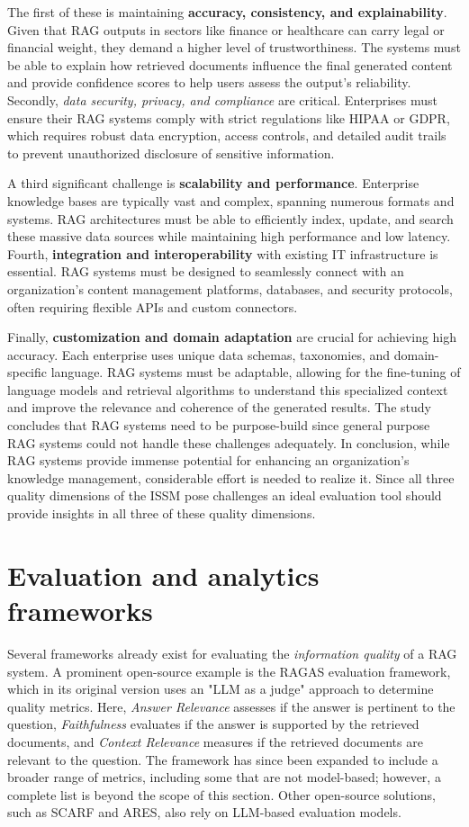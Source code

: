 \documentclass[
	english,
	ruledheaders=section,%
	class=report,%
	thesis={type=bachelor},%
	accentcolor=1b,%
	custommargins=true,%
	marginpar=false,%
	parskip=half-,%
	fontsize=11pt,%
	DIV=14,
]{tudapub}
\begin{document}
The first of these is maintaining \textbf{accuracy, consistency, and explainability}. Given that RAG outputs in sectors like finance or healthcare can carry legal or financial weight, they demand a higher level of trustworthiness. The systems must be able to explain how retrieved documents influence the final generated content and provide confidence scores to help users assess the output's reliability. Secondly, \emph{data security, privacy, and compliance} are critical. Enterprises must ensure their RAG systems comply with strict regulations like HIPAA or GDPR, which requires robust data encryption, access controls, and detailed audit trails to prevent unauthorized disclosure of sensitive information.

A third significant challenge is \textbf{scalability and performance}. Enterprise knowledge bases are typically vast and complex, spanning numerous formats and systems. RAG architectures must be able to efficiently index, update, and search these massive data sources while maintaining high performance and low latency. Fourth, \textbf{integration and interoperability} with existing IT infrastructure is essential. RAG systems must be designed to seamlessly connect with an organization's content management platforms, databases, and security protocols, often requiring flexible APIs and custom connectors.

Finally, \textbf{customization and domain adaptation} are crucial for achieving high accuracy. Each enterprise uses unique data schemas, taxonomies, and domain-specific language. RAG systems must be adaptable, allowing for the fine-tuning of language models and retrieval algorithms to understand this specialized context and improve the relevance and coherence of the generated results.
The study concludes that RAG systems need to be purpose-build since general purpose RAG systems could not handle these challenges adequately.
In conclusion, while RAG systems provide immense potential for enhancing an organization's knowledge management, considerable effort is needed to realize it. Since all three quality dimensions of the ISSM pose challenges an ideal evaluation tool should provide insights in all three of these quality dimensions.
\section{Evaluation and analytics frameworks}
Several frameworks already exist for evaluating the \textit{information quality} of a RAG system. A prominent open-source example is the RAGAS evaluation framework, which in its original version uses an "LLM as a judge" approach to determine quality metrics. Here, \textit{Answer Relevance} assesses if the answer is pertinent to the question, \textit{Faithfulness} evaluates if the answer is supported by the retrieved documents, and \textit{Context Relevance} measures if the retrieved documents are relevant to the question. The framework has since been expanded to include a broader range of metrics, including some that are not model-based; however, a complete list is beyond the scope of this section. Other open-source solutions, such as SCARF and ARES, also rely on LLM-based evaluation models.
\end{document}
